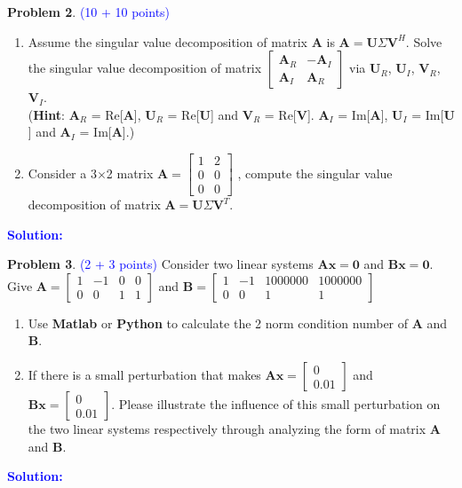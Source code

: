 \documentclass[english,onecolumn]{IEEEtran}
\begin{document}
\newpage

\noindent\textbf{Problem 2}. \textcolor{blue}{(10 + 10 points)}
\begin{enumerate}
	\item Assume the singular value decomposition of matrix $\mathbf{A}$ is $\mathbf{A}=\mathbf{U}\Sigma\mathbf{V}^H$. Solve the singular value decomposition of matrix $\begin{bmatrix}
 \mathbf{A}_R & -\mathbf{A}_I \\ 
 \mathbf{A}_I & \mathbf{A}_R
\end{bmatrix}$ via $\mathbf{U}_R$, $\mathbf{U}_I$, $\mathbf{V}_R$, $\mathbf{V}_I$.\\
(\textbf{Hint}: $\mathbf{A}_R$ = Re[$\mathbf{A}$], $\mathbf{U}_R$ = Re[$\mathbf{U}$] and $\mathbf{V}_R$ = Re[$\mathbf{V}$]. $\mathbf{A}_I$ = Im[$\mathbf{A}$], $\mathbf{U}_I$ = Im[$\mathbf{U}$] and $\mathbf{A}_I$ = Im[$\mathbf{A}$].)
 	\item Consider a 3$\times$2 matrix $\mathbf{A} = \begin{bmatrix}
 1 & 2\\ 
 0 & 0\\ 
 0 & 0  
\end{bmatrix}$ , compute the singular value decomposition of matrix $\mathbf{A}=\mathbf{U}\Sigma\mathbf{V}^T$.
\end{enumerate}
\noindent\textcolor{blue}{
	\textbf{Solution:}
	}

\noindent\textbf{Problem 3}. \textcolor{blue}{(2 + 3 points)}
Consider two linear systems $\mathbf{Ax=0}$ and $\mathbf{Bx=0}$. Give $\mathbf{A} = \begin{bmatrix}
 1 & -1 & 0 & 0 \\ 
 0 & 0 & 1 & 1 
\end{bmatrix}$ and $\mathbf{B} = \begin{bmatrix}
 1 & -1 & 1000000 & 1000000 \\ 
 0 & 0 & 1 & 1 
\end{bmatrix}$\\
\begin{enumerate}
	\item Use \textbf{Matlab} or \textbf{Python} to calculate the 2 norm condition number of $\mathbf{A}$ and $\mathbf{B}$.
 	\item If there is a small perturbation that makes $\mathbf{Ax=}\begin{bmatrix}
 0  \\ 
 0.01 
\end{bmatrix}$ and $\mathbf{Bx=}\begin{bmatrix}
 0  \\ 
 0.01 
\end{bmatrix}$. Please illustrate the influence of this small perturbation on the two linear systems respectively through analyzing the form of matrix $\mathbf{A}$ and $\mathbf{B}$.
 \end{enumerate}
\noindent\textcolor{blue}{
	\textbf{Solution:}
}
\newpage
\end{document}
